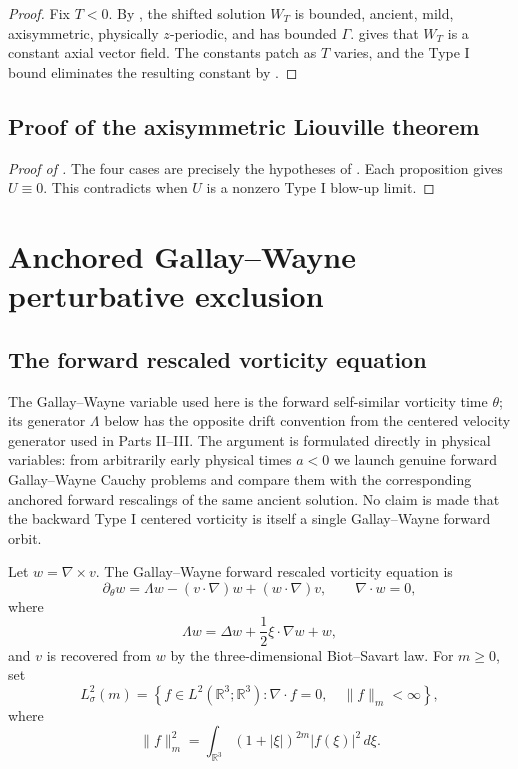 \documentclass[11pt]{amsart}
\theoremstyle{plain}
\theoremstyle{definition}
\theoremstyle{remark}
\numberwithin{equation}{section}
\begin{document}
\begin{proof}
Fix \(T<0\).  By , the shifted solution \(W_T\) is
bounded, ancient, mild, axisymmetric, physically \(z\)-periodic, and has
bounded \(\Gamma\).   gives that \(W_T\) is a constant axial vector
field.  The constants patch as \(T\) varies, and the Type I bound eliminates
the resulting constant by .
\end{proof}

\subsection{Proof of the axisymmetric Liouville theorem}

\begin{proof}[Proof of ]
The four cases are precisely the hypotheses of
.
Each proposition gives \(U\equiv0\).  This contradicts
 when \(U\) is a nonzero Type I blow-up limit.
\end{proof}

\section{Anchored Gallay--Wayne perturbative exclusion}
\label{p3:sec:weighted-vorticity}

\subsection{The forward rescaled vorticity equation}

The Gallay--Wayne variable used here is the forward self-similar vorticity
time \(\theta\); its generator \(\Lambda\) below has the opposite drift
convention from the centered velocity generator used in Parts II--III.  The
argument is formulated directly in physical variables: from arbitrarily early
physical times \(a<0\) we launch genuine forward Gallay--Wayne Cauchy
problems and compare them with the corresponding anchored forward rescalings of
the same ancient solution.  No claim is made that the backward Type I centered
vorticity is itself a single Gallay--Wayne forward orbit.

Let \(w=\nabla\times v\).  The Gallay--Wayne forward rescaled vorticity equation is
\begin{equation}\label{p3:eq:weighted-vorticity}
   \partial_\theta w
   =
   \Lambda w-(v\cdot\nabla)w+(w\cdot\nabla)v,
   \qquad \nabla\cdot w=0,
\end{equation}
where
\begin{equation}\label{p3:eq:lambda}
   \Lambda w=\Delta w+\frac12\xi\cdot\nabla w+w,
\end{equation}
and \(v\) is recovered from \(w\) by the three-dimensional Biot--Savart law.
For \(m\ge0\), set
\[
   L^2_\sigma(m)
   =
   \left\{
      f\in L^2(\mathbb R^3;\mathbb R^3):
      \nabla\cdot f=0,\quad \|f\|_m<\infty
   \right\},
\]
where
\[
   \|f\|_m^2
   =
   \int_{\mathbb R^3}(1+|\xi|)^{2m}|f(\xi)|^2\,d\xi .
\]
\end{document}
